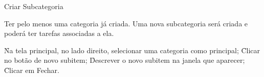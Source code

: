 \begin{funcionalidade}{Criar Subcategoria}



	\condicao
	{Ter pelo menos uma categoria já criada.} %
	{Uma nova subcategoria será criada e poderá ter tarefas associadas a ela.} %

	\begin{fluxo}
		\f Na tela principal, no lado direito, selecionar uma categoria como principal;
		\f Clicar no botão de novo subitem;
		\f Descrever o novo subitem na janela que aparecer;
		\f Clicar em Fechar.
	\end{fluxo}


\end{funcionalidade}

